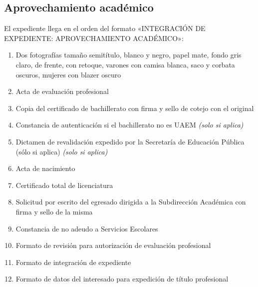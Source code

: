 \subsection{Aprovechamiento académico}
El expediente llega en el orden del formato «INTEGRACIÓN DE EXPEDIENTE: APROVECHAMIENTO ACADÉMICO»:
\begin{enumerate}
  \item Dos fotografías tamaño semitítulo, blanco y negro, papel mate, fondo gris claro, de frente, con retoque, varones con camisa blanca, saco y corbata oscuros, mujeres con blazer oscuro
  \item Acta de evaluación profesional
  \item Copia del certificado de bachillerato con firma y sello de cotejo con el original
  \item Constancia de autenticación si el bachillerato no es UAEM \emph{(solo si aplica)}
  \item Dictamen de revalidación expedido por la Secretaría de Educación Pública (sólo si aplica) \emph{(solo si aplica)}
  \item Acta de nacimiento
  \item Certificado total de licenciatura
  \item Solicitud por escrito del egresado dirigida a la Subdirección Académica con firma y sello de la misma
  \item Constancia de no adeudo a Servicios Escolares
  \item Formato de revisión para autorización de evaluación profesional
  \item Formato de integración de expediente
  \item Formato de datos del interesado para expedición de título profesional
\end{enumerate}
